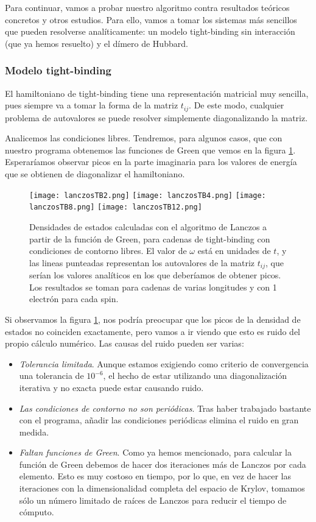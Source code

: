 \documentclass[12pt,twoside]{article}
\begin{document}
Para continuar, vamos a probar nuestro algoritmo contra resultados teóricos concretos y otros estudios. Para ello, vamos a tomar los sistemas más sencillos que pueden resolverse analíticamente: un modelo tight-binding sin interacción (que ya hemos resuelto) y el dímero de Hubbard.
\subsubsection{Modelo tight-binding}

El hamiltoniano de tight-binding tiene una representación matricial muy sencilla, pues siempre va a tomar la forma de la matriz $t_{ij}$. De este modo, cualquier problema de autovalores se puede resolver simplemente diagonalizando la matriz.

Analicemos las condiciones libres. Tendremos, para algunos casos, que con nuestro programa obtenemos las funciones de Green que vemos en la figura \ref{fig:greenTB}. Esperaríamos observar picos en la parte imaginaria para los valores de energía que se obtienen de diagonalizar el hamiltoniano.
\begin{figure}[h!]
  \begin{center}
    \texttt{[image: lanczosTB2.png]}
    \texttt{[image: lanczosTB4.png]}
    \texttt{[image: lanczosTB8.png]}
    \texttt{[image: lanczosTB12.png]}
  \end{center}
  \caption{Densidades de estados calculadas con el algoritmo de Lanczos a partir de la función de Green, para cadenas de tight-binding con condiciones de contorno libres. El valor de $\omega$ está en unidades de $t$, y las lineas punteadas representan los autovalores de la matriz $t_{ij}$, que serían los valores analíticos en los que deberíamos de obtener picos. Los resultados se toman para cadenas de varias longitudes y con 1 electrón para cada spin.}
  \label{fig:greenTB}
\end{figure}

Si observamos la figura \ref{fig:greenTB}, nos podría preocupar que los picos de la densidad de estados no coinciden exactamente, pero vamos a ir viendo que esto es ruido del propio cálculo numérico. Las causas del ruido pueden ser varias:
\begin{itemize}
  \item \textit{Tolerancia limitada}. Aunque estamos exigiendo como criterio de convergencia una tolerancia de $10^{-6}$, el hecho de estar utilizando una diagonalización iterativa y no exacta puede estar causando ruido.
  \item \textit{Las condiciones de contorno no son periódicas}. Tras haber trabajado bastante con el programa, añadir las condiciones periódicas elimina el ruido en gran medida.
  \item \textit{Faltan funciones de Green}. Como ya hemos mencionado, para calcular la función de Green debemos de hacer dos iteraciones más de Lanczos por cada elemento. Esto es muy costoso en tiempo, por lo que, en vez de hacer las iteraciones con la dimensionalidad completa del espacio de Krylov, tomamos sólo un número limitado de raíces de Lanczos para reducir el tiempo de cómputo.
\end{itemize}
\end{document}
